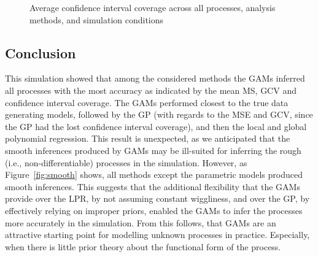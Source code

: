 \documentclass[man, floatsintext]{apa7}
\begin{document}
\begin{sidewaysfigure*}[htbp]
  \caption{Average confidence interval coverage across all processes, analysis
    methods, and simulation conditions}
  \label{fig:mean_results_ci_coverage}
\end{sidewaysfigure*}

\subsection{Conclusion}

This simulation showed that among the considered methods the GAMs inferred all
processes with the most accuracy as indicated by the mean MS, GCV and
confidence interval coverage. The GAMs performed closest to the true data
generating models, followed by the GP (with regards to the MSE and GCV, since
the GP had the lost confidence interval coverage), and then the local and
global polynomial regression. This result is unexpected, as we anticipated that
the smooth inferences produced by GAMs may be ill-suited for inferring the
rough (i.e., non-differentiable) processes in the simulation. However, as
Figure~\ref{fig:smooth} shows, all methods except the parametric models
produced smooth inferences. This suggests that the additional flexibility that
the GAMs provide over the LPR, by not assuming constant wiggliness, and over
the GP, by effectively relying on improper priors, enabled the GAMs to infer
the processes more accurately in the simulation. From this follows, that GAMs
are an attractive starting point for modelling unknown processes in practice.
Especially, when there is little prior theory about the functional form of the
process.
\end{document}
